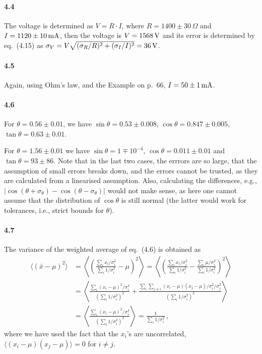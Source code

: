 \documentclass[a4paper,12pt]{article}
\begin{document}
\paragraph{4.4} The voltage is determined as $V = R \cdot I$, where $R = 1400\pm 30\,\Omega$ and $I=1120\pm 10\,{\rm mA}$, then the voltage is $V=1568\,{\rm V}$ and its error is determined by eq.\ (4.15) as $\sigma_V =V\sqrt{(\sigma_R/R)^2+(\sigma_I/I)^2} = 36\,{\rm V}$.

\paragraph{4.5} Again, using Ohm's law, and the Example on p.\ 66, $I=50\pm 1\,{\rm mA}$.

\paragraph{4.6} For $\theta=0.56\pm 0.01$, we have $\sin\theta = 0.53\pm 0.008$, $\cos\theta = 0.847\pm 0.005$, $\tan\theta = 0.63\pm 0.01$.

For $\theta=1.56\pm 0.01$ we have $\sin\theta=1\mp 10^{-4}$, $\cos\theta=0.011\pm 0.01$ and $\tan\theta=93\pm 86$. Note that in the last two cases, the errrors are so large, that the assumption of small errors breaks down, and the errors cannot be trusted, as they are calculated from a linearised assumption. Also, calculating the differences, e.g., $|\cos(\theta+\sigma_\theta) - \cos(\theta-\sigma_\theta)|$ would not make sense, as here one cannot assume that the distribution of $\cos\theta$ is still normal (the latter would work for tolerances, i.e., strict bounds for $\theta$).

\paragraph{4.7} The variance of the weighted average of eq.\ (4.6) is obtained as
\[\begin{aligned}
 \langle (\bar x - \mu)^2 \rangle &= \left\langle\left( \frac{\sum_i x_i/\sigma_i^2}{\sum_i 1/\sigma_i^2}-\mu\right)^2\right\rangle = \left\langle \left( \frac{\sum_i x_i/\sigma_i^2}{\sum_i 1/\sigma_i^2} - \frac{\sum_i \mu/\sigma_i^2}{\sum_i 1/\sigma_i^2}\right)^2\right\rangle\\
 &= \left\langle \frac{\sum_i (x_i-\mu)^2/\sigma_i^4}{(\sum_i 1/\sigma_i^2)^2} + \frac{\sum_i\sum_{j\ne i}(x_i-\mu)(x_j-\mu)/\sigma_i^2/\sigma_j^2}{(\sum_i 1/\sigma_i^2)^2}\right\rangle\\
 &= \left\langle \frac{\sum_i (x_i-\mu)^2/\sigma_i^4}{(\sum_i 1/\sigma_i^2)^2}\right\rangle = \frac{1}{\sum_i 1/\sigma_i^2}\,,
\end{aligned}\]
where we have used the fact that the $x_i$'s are uncorrelated, $\langle (x_i-\mu)(x_j-\mu)\rangle =0$ for $i\ne j$.
\end{document}
